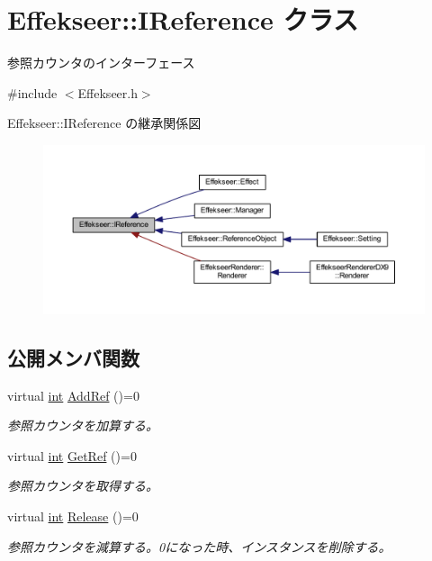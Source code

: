 \hypertarget{class_effekseer_1_1_i_reference}{}\section{Effekseer\+:\+:I\+Reference クラス}
\label{class_effekseer_1_1_i_reference}


参照カウンタのインターフェース  




{\ttfamily \#include $<$Effekseer.\+h$>$}



Effekseer\+:\+:I\+Reference の継承関係図\nopagebreak
\begin{figure}[H]
\begin{center}
\leavevmode
\includegraphics[width=350pt]{class_effekseer_1_1_i_reference__inherit__graph}
\end{center}
\end{figure}
\subsection*{公開メンバ関数}
\begin{DoxyCompactItemize}
\item 
virtual \mbox{\hyperlink{namespace_effekseer_ace0abf7c2e6947e519ebe8b54cbcc30a}{int}} \mbox{\hyperlink{class_effekseer_1_1_i_reference_a3e3b54e8e5081e24f5784e4f9b8f6257}{Add\+Ref}} ()=0
\begin{DoxyCompactList}\small\item\em 参照カウンタを加算する。 \end{DoxyCompactList}\item 
virtual \mbox{\hyperlink{namespace_effekseer_ace0abf7c2e6947e519ebe8b54cbcc30a}{int}} \mbox{\hyperlink{class_effekseer_1_1_i_reference_a95274c788c8c03d27a3e424facc728b6}{Get\+Ref}} ()=0
\begin{DoxyCompactList}\small\item\em 参照カウンタを取得する。 \end{DoxyCompactList}\item 
virtual \mbox{\hyperlink{namespace_effekseer_ace0abf7c2e6947e519ebe8b54cbcc30a}{int}} \mbox{\hyperlink{class_effekseer_1_1_i_reference_ad8d601188c0f088f4748aa2da8758bb5}{Release}} ()=0
\begin{DoxyCompactList}\small\item\em 参照カウンタを減算する。0になった時、インスタンスを削除する。 \end{DoxyCompactList}\end{DoxyCompactItemize}


